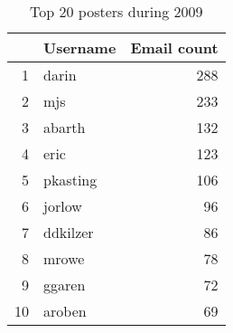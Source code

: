 \begin{table}[!htpb]
\begin{center}
\begin{tabular}{rlr}
  \hline
 & Username & Email count \\ 
  \hline
1 & darin & 288 \\ 
  2 & mjs & 233 \\ 
  3 & abarth & 132 \\ 
  4 & eric & 123 \\ 
  5 & pkasting & 106 \\ 
  6 & jorlow &  96 \\ 
  7 & ddkilzer &  86 \\ 
  8 & mrowe &  78 \\ 
  9 & ggaren &  72 \\ 
  10 & aroben &  69 \\ 
   \hline
\end{tabular}
\caption{Top 20 posters during 2009}
\label{emails:2009top20}
\end{center}
\end{table}
